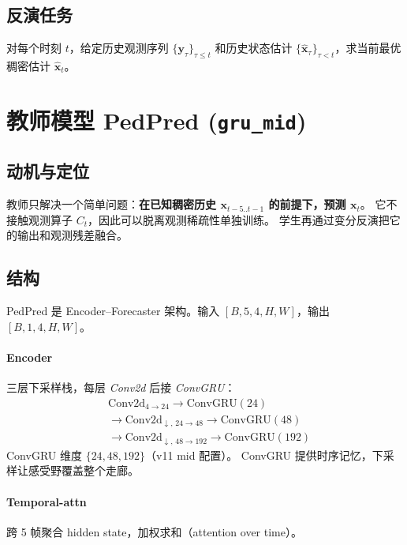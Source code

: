 \documentclass[11pt,a4paper]{ctexart}
\begin{document}
\subsection{反演任务}

对每个时刻 $t$，给定历史观测序列 $\{\mathbf{y}_\tau\}_{\tau\le t}$ 和历史状态估计 $\{\hat{\mathbf{x}}_\tau\}_{\tau< t}$，求当前最优稠密估计 $\hat{\mathbf{x}}_t$。

\section{教师模型 PedPred (\texttt{gru\_mid})}

\subsection{动机与定位}

教师只解决一个简单问题：\textbf{在已知稠密历史 $\mathbf{x}_{t-5..t-1}$ 的前提下，预测 $\mathbf{x}_t$}。
它不接触观测算子 $C_t$，因此可以脱离观测稀疏性单独训练。
学生再通过变分反演把它的输出和观测残差融合。

\subsection{结构}

PedPred 是 Encoder–Forecaster 架构。输入 $[B,5,4,H,W]$，输出 $[B,1,4,H,W]$。

\paragraph{Encoder}
三层下采样栈，每层 \textit{Conv2d} 后接 \textit{ConvGRU}：
\begin{equation*}
\begin{aligned}
&\text{Conv2d}_{4\to 24} \to \text{ConvGRU}(24)\\
&\to \text{Conv2d}_{\downarrow,\, 24\to 48} \to \text{ConvGRU}(48)\\
&\to \text{Conv2d}_{\downarrow,\, 48\to 192} \to \text{ConvGRU}(192)
\end{aligned}
\end{equation*}
ConvGRU 维度 $\{24, 48, 192\}$（v11 mid 配置）。
ConvGRU 提供时序记忆，下采样让感受野覆盖整个走廊。

\paragraph{Temporal-attn}
跨 5 帧聚合 hidden state，加权求和（attention over time）。
\end{document}
